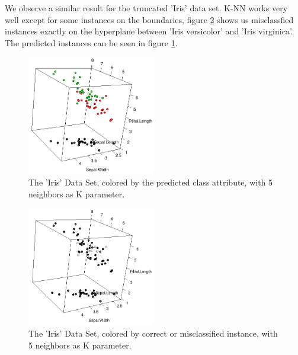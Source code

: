 \documentclass[paper=a4, fontsize=11pt]{scrartcl} %
\numberwithin{equation}{section} %
\numberwithin{figure}{section} %
\numberwithin{table}{section} %
\begin{document}
We observe a similar result for the truncated 'Iris' data set. K-NN works very well except for some instances on the boundaries, figure \ref{fig:iris:correct:k5} shows us misclassfied instances exactly on the hyperplane between 'Iris versicolor' and 'Iris virginica'. The predicted instances can be seen in figure \ref{fig:iris:predicted:k5}.
\begin{figure}[0.5\textwidth]
    \begin{center}
\includegraphics[width=0.5\textwidth]{Iris_predicted_k5}
    \end{center}
\caption['Iris' prediction with k=5]{The 'Iris' Data Set, colored by the predicted class attribute, with 5 neighbors as K parameter.}
\label{fig:iris:predicted:k5}
\end{figure}


\begin{figure}[0.5\textwidth]
    \begin{center}
\includegraphics[width=0.5\textwidth]{Iris_correct_k5}
    \end{center}
\caption['Iris' correctness with k=5]{The 'Iris' Data Set, colored by correct or misclassified instance, with 5 neighbors as K parameter.}
\label{fig:iris:correct:k5}
\end{figure}
\end{document}

